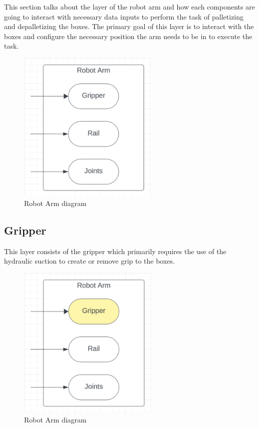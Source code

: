 This section talks about the layer of the robot arm and how each components are going to interact with necessary data inputs to perform the task of palletizing and depalletizing the boxes. The primary goal of this layer is to interact with the boxes and configure the necessary position the arm needs to be in to execute the task.
\begin{figure}[h!]
	\centering
 	\includegraphics[width=0.60\textwidth]{images/arm}
 \caption{Robot Arm diagram}
\end{figure}


\subsection{Gripper}
This layer consists of the gripper which primarily requires the use of the hydraulic suction to create or remove grip to the boxes.

\begin{figure}[h!]
	\centering
 	\includegraphics[width=0.60\textwidth]{images/gripper.png}
 \caption{Robot Arm diagram}
\end{figure}

